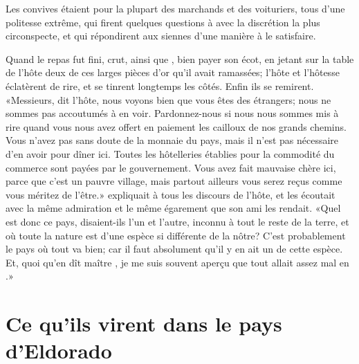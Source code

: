 Les convives étaient pour la plupart des marchands et des voituriers,
tous d’une politesse extrême, qui firent quelques questions à 
avec la discrétion la plus circonspecte, et qui répondirent aux siennes
d’une manière à le satisfaire.

Quand le repas fut fini,  crut, ainsi que , bien payer
son écot, en jetant sur la table de l’hôte deux de ces larges pièces
d’or qu’il avait ramassées; l’hôte et l’hôtesse éclatèrent de rire, et
se tinrent longtemps les côtés. Enfin ils se remirent. «Messieurs, dit
l’hôte, nous voyons bien que vous êtes des étrangers; nous ne sommes
pas accoutumés à en voir. Pardonnez-nous si nous nous sommes mis à rire
quand vous nous avez offert en paiement les cailloux de nos grands
chemins. Vous n’avez pas sans doute de la monnaie du pays, mais il
n’est pas nécessaire d’en avoir pour dîner ici. Toutes les hôtelleries
établies pour la commodité du commerce sont payées par le gouvernement.
Vous avez fait mauvaise chère ici, parce que c’est un pauvre village,
mais partout ailleurs vous serez reçus comme vous méritez de l’être.»
 expliquait à  tous les discours de l’hôte, et 
les écoutait avec la même admiration et le même égarement que son ami
 les rendait. «Quel est donc ce pays, disaient-ils l’un et
l’autre, inconnu à tout le reste de la terre, et où toute la nature est
d’une espèce si différente de la nôtre? C’est probablement le pays où
tout va bien; car il faut absolument qu’il y en ait un de cette espèce.
Et, quoi qu’en dît maître , je me suis souvent aperçu que tout
allait assez mal en .»


\chapter{Ce qu’ils virent dans le pays d’Eldorado}



